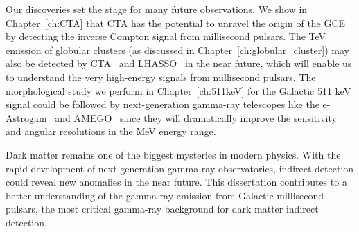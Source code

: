 \documentclass[doublespace,nopageskip]{VTthesis}
\begin{document}
Our discoveries set the stage for many future observations. We show in Chapter~\ref{ch:CTA} that CTA has the potential to unravel the origin of the GCE by detecting the inverse Compton signal from millisecond pulsars. The TeV emission of globular clusters (as discussed in Chapter~\ref{ch:globular_cluster}) may also be detected by CTA~\cite{2019scta.book.....C} and LHASSO~\cite{2019arXiv190502773B} in the near future, which will enable us to understand the very high-energy signals from millisecond pulsars. The morphological study we perform in Chapter~\ref{ch:511keV} for the Galactic 511 keV signal could be followed by next-generation gamma-ray telescopes like the e-Astrogam~\cite{2017ExA....44...25D} and AMEGO~\cite{2019BAAS...51g.245M} since they will dramatically improve the sensitivity and angular resolutions in the MeV energy range.

{Dark matter remains one of the biggest mysteries in modern physics. With the rapid development of next-generation gamma-ray observatories, indirect detection could reveal new anomalies in the near future. This dissertation contributes to a better understanding of the gamma-ray emission from Galactic millisecond pulsars, the most critical gamma-ray background for dark matter indirect detection.}







% 

%    

\appendix
\end{document}
